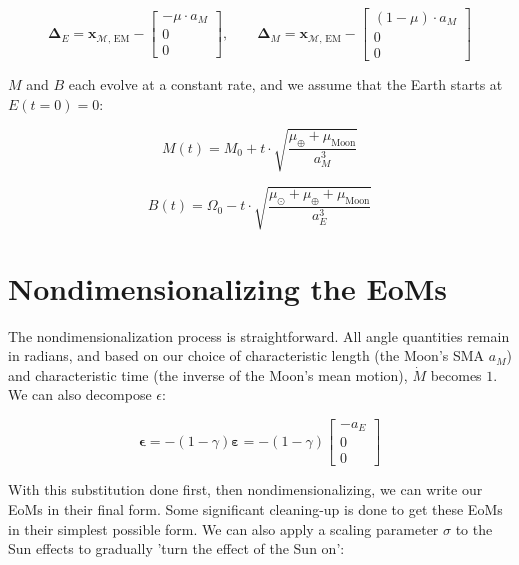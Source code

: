 \documentclass[]{article}
\begin{document}
	\begin{equation}
	\boldsymbol{\Delta}_E = \mathbf{x}_{\mathcal{M}\text{, EM}} - \begin{bmatrix}
		-\mu \cdot a_M \\ 0 \\ 0
	\end{bmatrix},\quad\quad\boldsymbol{\Delta}_M =  \mathbf{x}_{\mathcal{M}\text{, EM}} - \begin{bmatrix}
	(1-\mu) \cdot a_M \\ 0 \\ 0
	\end{bmatrix}
	\end{equation}
	
	$M$ and $B$ each evolve at a constant rate, and we assume that the Earth starts at $E(t=0) = 0$:
	
	\begin{equation*}
		M(t) = M_0 + t \cdot \sqrt{\frac{\mu_\oplus + \mu_\text{Moon}}{a_M^3}}
	\end{equation*}
	
	\begin{equation*}
		B(t) = \Omega_0 - t \cdot \sqrt{\frac{\mu_\odot + \mu_\oplus + \mu_\text{Moon}}{a_E^3}}
	\end{equation*}
	
	\section{Nondimensionalizing the EoMs}
	
	The nondimensionalization process is straightforward.  All angle quantities remain in radians, and based on our choice of characteristic length (the Moon's SMA $a_M$) and characteristic time (the inverse of the Moon's mean motion), $\dot{M}$ becomes $1$.  We can also decompose $\epsilon$:
	
	\begin{equation*}
		\boldsymbol{\epsilon} = -(1-\gamma) \boldsymbol{\varepsilon} = -(1-\gamma) \begin{bmatrix}
			-a_E \\ 0 \\ 0
		\end{bmatrix}
	\end{equation*}
	
	With this substitution done first, then nondimensionalizing, we can write our EoMs in their final form.  Some significant cleaning-up is done to get these EoMs in their simplest possible form.  We can also apply a scaling parameter $\sigma$ to the Sun effects to gradually 'turn the effect of the Sun on':
	
\end{document}
